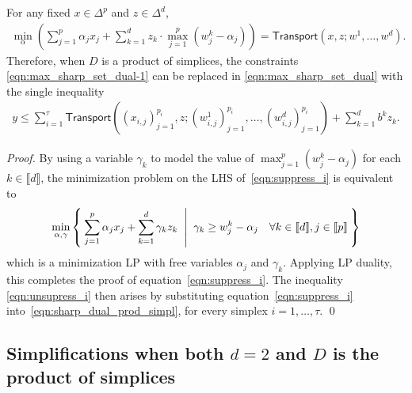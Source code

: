 \documentclass[smallextended]{svjour3}
\newcommand{\trans}{\mathsf{Transport}}
\begin{document}
\begin{proposition} \label{prop:transportationDuality}
For any fixed $x \in \Delta^{p}$ and $z \in \Delta^d$,
\begin{align} \label{eqn:suppress_i}
    \min_{\alpha} \left( \sum_{j=1}^{p}\alpha_{j}x_{j} + \sum_{k=1}^dz_k\cdot\max_{j=1}^p(w^k_{j} - \alpha_{j}) \right) = \trans(x,z;w^1,\ldots,w^d).
\end{align}
Therefore, when $D$ is a product of simplices, the constraints \eqref{eqn:max_sharp_set_dual-1} can be replaced in \eqref{eqn:max_sharp_set_dual} with the single inequality
\begin{align} \label{eqn:unsupress_i}
y\le\sum_{i=1}^{\tau}\trans((x_{i,j})_{j=1}^{p_i},z;(w^1_{i,j})_{j=1}^{p_i},\ldots,(w^d_{i,j})_{j=1}^{p_i})+\sum_{k=1}^db^kz_k.
\end{align}
\end{proposition}

\begin{proof}
By using a variable $\gamma_{k}$ to model the value of $\max_{j=1}^{p}(w^k_{j} - \alpha_{j})$ for each $k\in\llbracket d\rrbracket$, the minimization problem on the LHS of~\eqref{eqn:suppress_i} is equivalent to
\begin{alignat*}{2}
\min_{\alpha,\gamma}\Set{\sum_{j=1}^{p}\alpha_{j}x_{j}+\sum_{k=1}^d\gamma_{k}z_k \;|\;
\gamma_{k} \ge w^k_{j}-\alpha_{j} \quad\forall k\in\llbracket d\rrbracket,j\in\llbracket p\rrbracket}
\end{alignat*}
which is a minimization LP with free variables $\alpha_j$ and $\gamma_k$.
Applying LP duality, this completes the proof of equation~\eqref{eqn:suppress_i}. The inequality
\eqref{eqn:unsupress_i} then arises by substituting equation~\eqref{eqn:suppress_i} into~\eqref{eqn:sharp_dual_prod_simpl}, for every simplex $i=1,\ldots,\tau$.
\qed\end{proof}

\subsection{Simplifications when both $d=2$ and $D$ is the product of simplices} \label{sec:d-2-product-of-simplices}
\end{document}
